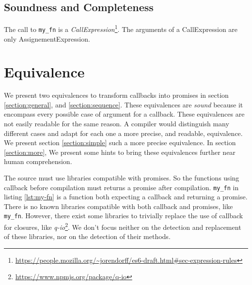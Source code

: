 \subsection{Soundness and Completeness} \label{section:soundness-completeness}

The call to \texttt{my_fn} is a \textit{CallExpression}\footnote{\url{https://people.mozilla.org/~jorendorff/es6-draft.html\#sec-expression-rules}}.
The arguments of a CallExpression are only AssignementExpression.







\section{Equivalence}

We present two equivalences to transform callbacks into promises in section \ref{section:general}, and \ref{section:sequence}.
These equivalences are \textit{sound} because it encompass every possible case of argument for a callback.
These equivalences are not easily readable for the same reason.
A compiler would distinguish many different cases and adapt for each one a more precise, and readable, equivalence.
We present section \ref{section:simple} such a more precise equivalence.
In section \ref{section:more}, We present some hints to bring these equivalences further near human comprehension.

The source must use libraries compatible with promises.
So the functions using callback before compilation must returns a promise after compilation.
\texttt{my_fn} in listing \ref{lst:my-fn} is a function both expecting a callback and returning a promise.
There is no known libraries compatible with both callback and promises, like \texttt{my_fn}.
However, there exist some libraries to trivially replace the use of callback for closures, like \textit{q-io}\footnote{\url{https://www.npmjs.org/package/q-io}}.
We don't focus neither on the detection and replacement of these libraries, nor on the detection of their methods.

